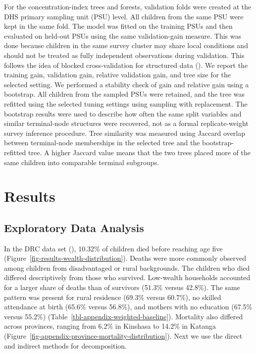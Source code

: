 \documentclass[
  11pt,
  a4paper,
]{article}
\begin{document}
For the concentration-index trees and forests, validation folds were
created at the DHS primary sampling unit (PSU) level. All children from
the same PSU were kept in the same fold. The model was fitted on the
training PSUs and then evaluated on held-out PSUs using the same
validation-gain measure. This was done because children in the same
survey cluster may share local conditions and should not be treated as
fully independent observations during validation. This follows the idea
of blocked cross-validation for structured data
(). We report the training gain, validation gain, relative
validation gain, and tree size for the selected setting. We performed a
stability check of gain and relative gain using a bootstrap. All
children from the sampled PSUs were retained, and the tree was refitted
using the selected tuning settings using sampling with replacement. The
bootstrap results were used to describe how often the same split
variables and similar terminal-node structures were recovered, not as a
formal replicate-weight survey inference procedure. Tree similarity was
measured using Jaccard overlap between terminal-node memberships in the
selected tree and the bootstrap-refitted tree. A higher Jaccard value
means that the two trees placed more of the same children into
comparable terminal subgroups.

\section{Results}\label{results}

\subsection{Exploratory Data Analysis}\label{exploratory-data-analysis}

In the DRC data set (), 10.32\% of children died before reaching age five
(Figure~\ref{fig-results-wealth-distribution}). Deaths were more
commonly observed among children from disadvantaged or rural
backgrounds. The children who died differed descriptively from those who
survived. Low-wealth households accounted for a larger share of deaths
than of survivors (51.3\% versus 42.8\%). The same pattern was present
for rural residence (69.3\% versus 60.7\%), no skilled attendance at
birth (65.6\% versus 56.8\%), and mothers with no education (67.5\%
versus 55.2\%) (Table~\ref{tbl-appendix-weighted-baseline}). Mortality
also differed across provinces, ranging from 6.2\% in Kinshasa to 14.2\%
in Katanga (Figure~\ref{fig-appendix-province-mortality-distribution}).
Next we use the direct and indirect methods for decomposition.
\end{document}
